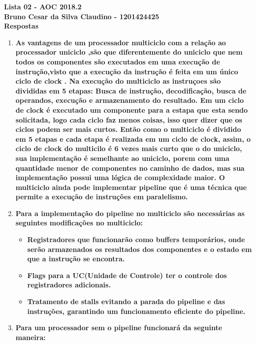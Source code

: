 \documentclass[12pt,a4paper]{article}
\begin{document}
\begin{titlepage}
\begin{center}

\textbf{Lista 02 - AOC 2018.2\\
Bruno Cesar da Silva Claudino - 1201424425\\}
\vspace{2cm}
\textbf{Respostas}
	
\end{center}
\begin{enumerate}[1)]
	\item
	\textbf{As vantagens de um processador multiciclo com a relação ao processador uniciclo ,são que diferentemente do uniciclo que nem todos os componentes são executados em uma execução de instrução,visto que a execução da instrução é feita em um único ciclo de clock . Na execução do multiciclo as instruçoes são divididas em 5 etapas: Busca de instrução, decodificação, busca de operandos, execução e armazenamento do resultado. Em um ciclo de clock é executado um componente para a estapa que esta sendo solicitada, logo cada ciclo faz menos coisas, isso quer dizer que os ciclos podem ser mais curtos. Então como o multiciclo é dividido em 5 etapas e cada etapa é realizada em um ciclo de clock, assim, o ciclo de clock do multicilo é 6 vezes mais curto que o do uniciclo, sua implementação é semelhante ao uniciclo, porem com uma quantidade menor de componentes no caminho de dados, mas sua implementação possui uma lógica de complexidade maior. O multiciclo ainda pode implementar pipeline que é uma técnica que permite a execução de instruções em paralelismo.}
	\item
	\textbf{Para a implementação do pipeline no multiciclo são necessárias as seguintes modificações no multiciclo:\\}
	\begin{itemize}
		\item \textbf{Registradores que funcionarão como buffers temporários, onde serão armazenados os resultados dos componentes e o estado em que a instrução se encontra.}
		\item \textbf{Flags para a UC(Unidade de Controle) ter o controle dos registradores adicionais.}
		\item \textbf{Tratamento de stalls evitando a parada do pipeline e das instruções, garantindo um funcionamento eficiente do pipeline.}
	\end{itemize}
	\item \textbf{Para um processador sem o pipeline funcionará da seguinte maneira:
}
\end{enumerate}
\end{titlepage}
\end{document}
